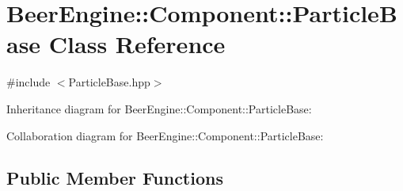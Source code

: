 \hypertarget{class_beer_engine_1_1_component_1_1_particle_base}{}\section{Beer\+Engine\+:\+:Component\+:\+:Particle\+Base Class Reference}
\label{class_beer_engine_1_1_component_1_1_particle_base}


{\ttfamily \#include $<$Particle\+Base.\+hpp$>$}



Inheritance diagram for Beer\+Engine\+:\+:Component\+:\+:Particle\+Base\+:


Collaboration diagram for Beer\+Engine\+:\+:Component\+:\+:Particle\+Base\+:
\subsection*{Public Member Functions}
